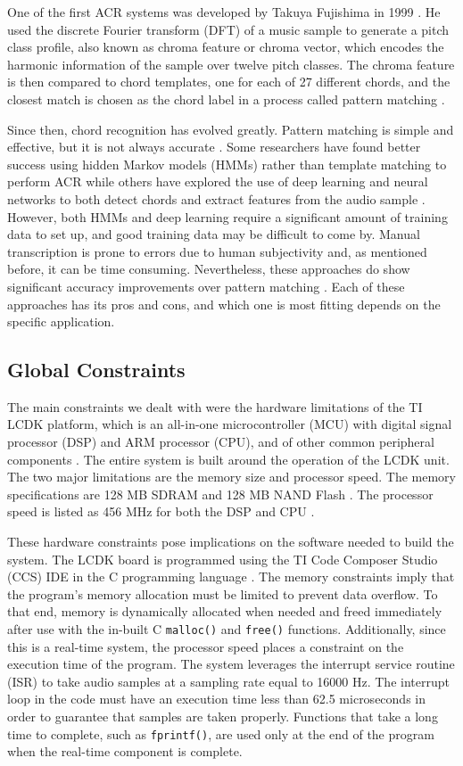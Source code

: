 \documentclass[journal]{IEEEtran}
\begin{document}
One of the first ACR systems was developed by Takuya Fujishima in 1999 \cite{pauwels}.
He used the discrete Fourier transform (DFT) of a music sample to generate a pitch class profile, also known as chroma feature or chroma vector, which encodes the harmonic information of the sample over twelve pitch classes.
The chroma feature is then compared to chord templates, one for each of 27 different chords, and the closest match is chosen as the chord label in a process called pattern matching \cite{fujishima}.

Since then, chord recognition has evolved greatly.
Pattern matching is simple and effective, but it is not always accurate \cite{jiang}.
Some researchers have found better success using hidden Markov models (HMMs) rather than template matching to perform ACR \cite{sheh} while others have explored the use of deep learning and neural networks to both detect chords \cite{boulanger} and extract features from the audio sample \cite{korzeniowski}.
However, both HMMs and deep learning require a significant amount of training data to set up, and good training data may be difficult to come by.
Manual transcription is prone to errors due to human subjectivity \cite{pauwels} and, as mentioned before, it can be time consuming.
Nevertheless, these approaches do show significant accuracy improvements over pattern matching \cite{jiang, boulanger}.
Each of these approaches has its pros and cons, and which one is most fitting depends on the specific application.


\subsection{Global Constraints}
The main constraints we dealt with were the hardware limitations of the TI LCDK platform, which is an all-in-one microcontroller (MCU) with digital signal processor (DSP) and ARM processor (CPU), and of other common peripheral components \cite{lcdk}.
The entire system is built around the operation of the LCDK unit.
The two major limitations are the memory size and processor speed.
The memory specifications are 128 MB SDRAM and 128 MB NAND Flash \cite{lcdk}.
The processor speed is listed as 456 MHz for both the DSP and CPU \cite{lcdk}.

These hardware constraints pose implications on the software needed to build the system.
The LCDK board is programmed using the TI Code Composer Studio (CCS) IDE in the C programming language \cite{lcdk}.
The memory constraints imply that the program’s memory allocation must be limited to prevent data overflow.
To that end, memory is dynamically allocated when needed and freed immediately after use with the in-built C \texttt{malloc()} and \texttt{free()} functions.
Additionally, since this is a real-time system, the processor speed places a constraint on the execution time of the program.
The system leverages the interrupt service routine (ISR) to take audio samples at a sampling rate equal to 16000 Hz.
The interrupt loop in the code must have an execution time less than 62.5 microseconds in order to guarantee that samples are taken properly.
Functions that take a long time to complete, such as \texttt{fprintf()}, are used only at the end of the program when the real-time component is complete.
\end{document}
